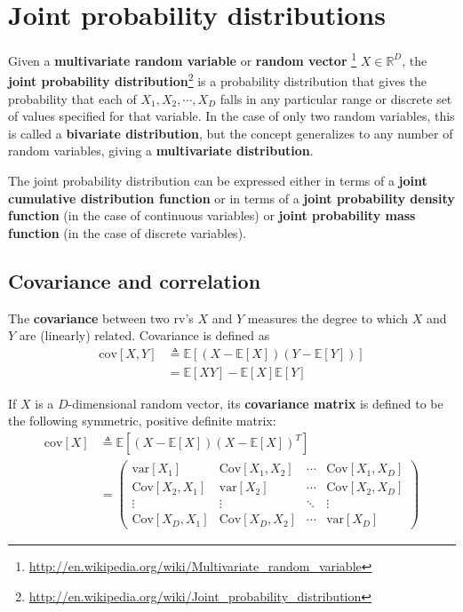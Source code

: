 \documentclass[graybox, envcountchap, twocolumn]{styles/svmult}
\begin{document}
\section{Joint probability distributions}
Given a \textbf{multivariate random variable} or \textbf{random vector} \footnote{\url{http://en.wikipedia.org/wiki/Multivariate_random_variable}} $X \in \mathbb{R}^D$, the \textbf{joint probability distribution}\footnote{\url{http://en.wikipedia.org/wiki/Joint_probability_distribution}} is a probability distribution that gives the probability that each of $X_1, X_2, \cdots,X_D$ falls in any particular range or discrete set of values specified for that variable. In the case of only two random variables, this is called a \textbf{bivariate distribution}, but the concept generalizes to any number of random variables, giving a \textbf{multivariate distribution}.

The joint probability distribution can be expressed either in terms of a \textbf{joint cumulative distribution function} or in terms of a \textbf{joint probability density function} (in the case of continuous variables) or \textbf{joint probability mass function} (in the case of discrete variables). 


\subsection{Covariance and correlation}
\begin{definition}
The \textbf{covariance} between two rv’s $X$ and $Y$ measures the degree to which $X$ and $Y$ are (linearly) related. Covariance is defined as
\begin{equation}
\begin{split}
\mathrm{cov}[X,Y] & \triangleq \mathbb{E}\left[(X-\mathbb{E}[X])(Y-\mathbb{E}[Y])\right] \\
         & =\mathbb{E}[XY]-\mathbb{E}[X]\mathbb{E}[Y]
\end{split}
\end{equation}
\end{definition}

\begin{definition}
If $X$ is a $D$-dimensional random vector, its \textbf{covariance matrix} is defined to be the following symmetric, positive definite matrix:
\begin{align}
\mathrm{cov}[X] & \triangleq \mathbb{E}\left[(X-\mathbb{E}[X])(X-\mathbb{E}[X])^T\right] \\
       &  = \left( \begin{array}{cccc}
           \text{var}[X_1] & \text{Cov}[X_1,X_2] & \cdots & \text{Cov}[X_1,X_D] \\
           \text{Cov}[X_2,X_1] & \text{var}[X_2] & \cdots & \text{Cov}[X_2,X_D] \\
		   \vdots & \vdots & \ddots & \vdots \\
           \text{Cov}[X_D,X_1] & \text{Cov}[X_D,X_2] & \cdots & \text{var}[X_D] \end{array} \right)
\end{align}
\end{definition}
\end{document}
